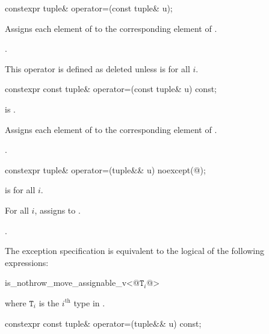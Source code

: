 %
\begin{itemdecl}
constexpr tuple& operator=(const tuple& u);
\end{itemdecl}

\begin{itemdescr}
\pnum
\effects
Assigns each element of  to the corresponding
element of .

\pnum
\returns
{}.

\pnum
\remarks
This operator is defined as deleted unless
 is  for all $i$.
\end{itemdescr}

%
\begin{itemdecl}
constexpr const tuple& operator=(const tuple& u) const;
\end{itemdecl}

\begin{itemdescr}
\pnum
\constraints
{} is .

\pnum
\effects
Assigns each element of  to the corresponding element of .

\pnum
\returns
{}.
\end{itemdescr}

%
\begin{itemdecl}
constexpr tuple& operator=(tuple&& u) noexcept(@\seebelow@);
\end{itemdecl}

\begin{itemdescr}
\pnum
\constraints
{} is  for all $i$.

\pnum
\effects
For all $i$, assigns  to
.

\pnum
\returns
{}.

\pnum
\remarks
The exception specification is equivalent to the logical  of the
following expressions:

\begin{codeblock}
is_nothrow_move_assignable_v<@$\mathtt{T}_i$@>
\end{codeblock}
where $\mathtt{T}_i$ is the $i^\text{th}$ type in .
\end{itemdescr}

%
\begin{itemdecl}
constexpr const tuple& operator=(tuple&& u) const;
\end{itemdecl}

